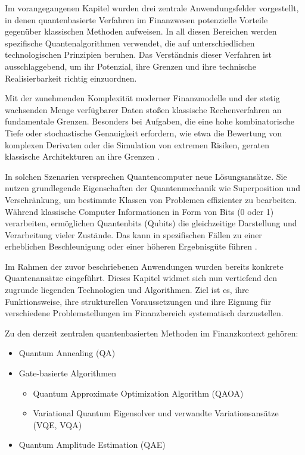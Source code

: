 Im vorangegangenen Kapitel wurden drei zentrale Anwendungsfelder vorgestellt, in denen quantenbasierte Verfahren im Finanzwesen potenzielle Vorteile gegenüber klassischen Methoden aufweisen. In all diesen Bereichen werden spezifische Quantenalgorithmen verwendet, die auf unterschiedlichen technologischen Prinzipien beruhen. Das Verständnis dieser Verfahren ist ausschlaggebend, um ihr Potenzial, ihre Grenzen und ihre technische Realisierbarkeit richtig einzuordnen.

Mit der zunehmenden Komplexität moderner Finanzmodelle und der stetig wachsenden Menge verfügbarer Daten stoßen klassische Rechenverfahren an fundamentale Grenzen. Besonders bei Aufgaben, die eine hohe kombinatorische Tiefe oder stochastische Genauigkeit erfordern, wie etwa die Bewertung von komplexen Derivaten oder die Simulation von extremen Risiken, geraten klassische Architekturen an ihre Grenzen \cite{plos2024, bouland_prospects_2020}.

In solchen Szenarien versprechen Quantencomputer neue Lösungsansätze. Sie nutzen grundlegende Eigenschaften der Quantenmechanik wie Superposition und Verschränkung, um bestimmte Klassen von Problemen effizienter zu bearbeiten. Während klassische Computer Informationen in Form von Bits (0 oder 1) verarbeiten, ermöglichen Quantenbits (Qubits) die gleichzeitige Darstellung und Verarbeitung vieler Zustände. Das kann in spezifischen Fällen zu einer erheblichen Beschleunigung oder einer höheren Ergebnisgüte führen \cite{orus_quantum_2019, bouland_prospects_2020, martin2022}.

Im Rahmen der zuvor beschriebenen Anwendungen wurden bereits konkrete Quantenansätze eingeführt. Dieses Kapitel widmet sich nun vertiefend den zugrunde liegenden Technologien und Algorithmen. Ziel ist es, ihre Funktionsweise, ihre strukturellen Voraussetzungen und ihre Eignung für verschiedene Problemstellungen im Finanzbereich systematisch darzustellen.

Zu den derzeit zentralen quantenbasierten Methoden im Finanzkontext gehören:

\begin{itemize}
  \item Quantum Annealing (QA)
  \item Gate-basierte Algorithmen
    \begin{itemize}
      \item Quantum Approximate Optimization Algorithm (QAOA)
      \item Variational Quantum Eigensolver und verwandte Variationsansätze (VQE, VQA)
    \end{itemize}
  \item Quantum Amplitude Estimation (QAE)
\end{itemize}

